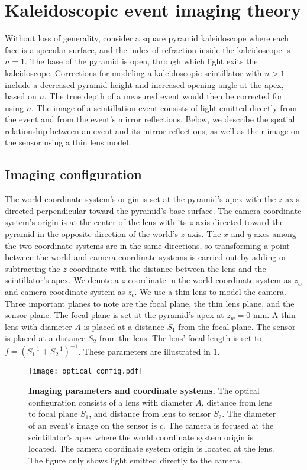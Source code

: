 \section{Kaleidoscopic event imaging theory} \label{sec:theory}

Without loss of generality, consider a square pyramid kaleidoscope where each 
face is a specular surface, 
and the index of refraction inside the kaleidoscope is $n=1$.
The base of the pyramid is open, through which light exits the kaleidoscope.
Corrections for modeling a kaleidoscopic scintillator with $n>1$ include 
a decreased pyramid height and increased opening angle at the apex, based on $n$.
The true depth of a measured event would then be corrected for using $n$.
The image of a scintillation event consists of light emitted directly from the 
event and from the event's mirror reflections.
Below, we describe the spatial relationship between an event and its mirror 
reflections, as well as their image on the sensor using a thin lens model.


\subsection{Imaging configuration}

The world coordinate system's origin is set at the pyramid's apex with the 
$z$-axis directed perpendicular toward the pyramid's base surface.
The camera coordinate system's origin is at the center of the lens with its 
$z$-axis directed toward the pyramid in the opposite direction of the world's $z$-axis.
The $x$ and $y$ axes among the two coordinate systems are in the same directions, 
so transforming a point between the world and camera coordinate systems is 
carried out by adding or subtracting the $z$-coordinate with the distance between 
the lens and the scintillator's apex.
We denote a $z$-coordinate in the world coordinate system as $z_w$ and camera 
coordinate system as $z_c$.
We use a thin lens to model the camera.
Three important planes to note are the focal plane, the thin lens plane, and the 
sensor plane.
The focal plane is set at the pyramid's apex at $z_w=0$ mm.
A thin lens with diameter $A$ is placed at a distance $S_1$ from the focal plane. 
The sensor is placed at a distance $S_2$ from the lens.
The lens' focal length is set to $f=(S_1^{-1}+S_2^{-1})^{-1}$.
These parameters are illustrated in \cref{fig:optical_config}.

\begin{figure}
\centering
\texttt{[image: optical\_config.pdf]}
\caption{\textbf{Imaging parameters and coordinate systems.} 
The optical configuration consists of a lens with diameter $A$, distance from 
lens to focal plane $S_1$, and distance from lens to sensor $S_2$. The diameter 
of an event's image on the sensor is $c$. The camera is focused at the 
scintillator's apex where the world coordinate system origin is located. The 
camera coordinate system origin is located at the lens. The figure only shows 
light emitted directly to the camera.} 
\label{fig:optical_config}
\end{figure}

